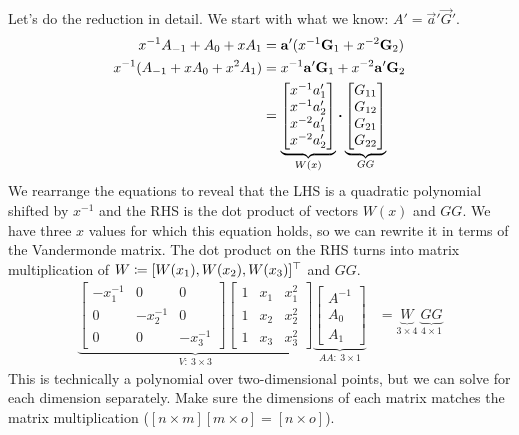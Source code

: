 Let's do the reduction in detail.
We start with what we know: $A' = \vec{a}'\vec{G}'$.
%
\begin{align*}
    x^{-1} A_{-1} + A_0 + x A_1 &= \mathbf{a}' (x^{-1} \mathbf{G}_1 + x^{-2} \mathbf{G}_2) \\
    x^{-1} (A_{-1} + x A_0 + x^2 A_1) &= x^{-1} \mathbf{a}' \mathbf{G}_1 + x^{-2} \mathbf{a}' \mathbf{G}_2 \\
    &= \underbrace{\begin{bmatrix} x^{-1} a'_1 \\ x^{-1} a'_2 \\ x^{-2} a'_1 \\ x^{-2} a'_2 \end{bmatrix}}_{W(x)}
    \boldsymbol{\cdot}
    \underbrace{\begin{bmatrix} G_{11} \\ G_{12} \\ G_{21} \\ G_{22} \end{bmatrix}}_{GG}
\end{align*}
%
We rearrange the equations to reveal that the LHS is a quadratic polynomial shifted by $x^{-1}$
and the RHS is the dot product of vectors $W(x)$ and $GG$.
We have three $x$ values for which this equation holds,
so we can rewrite it in terms of the Vandermonde matrix.
The dot product on the RHS turns into matrix multiplication of $W \coloneqq [W(x_1), W(x_2), W(x_3)]^\top$ and $GG$.
%
\begin{align*}
    \underbrace{\begin{bmatrix}
        -x_1^{-1} & 0 & 0 \\
        0 & -x_2^{-1} & 0 \\
        0 & 0 & -x_3^{-1}
    \end{bmatrix} \begin{bmatrix}
        1 & x_1 & x_1^2 \\
        1 & x_2 & x_2^2 \\
        1 & x_3 & x_3^2
    \end{bmatrix}}_{V:\ 3 \times 3} \underbrace{\begin{bmatrix}
        A^{-1} \\ A_0 \\ A_1
    \end{bmatrix}}_{AA:\ 3 \times 1} &= \underbrace{W}_{3 \times 4}\ \underbrace{GG}_{4 \times 1}
\end{align*}
%
This is technically a polynomial over two-dimensional points,
but we can solve for each dimension separately.
Make sure the dimensions of each matrix matches the matrix multiplication ($[n \times m][m \times o] = [n \times o]$).

